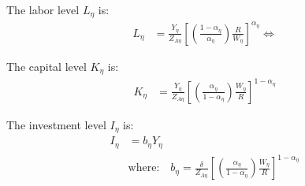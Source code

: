 \documentclass[../thesis.tex]{subfiles}
\begin{document}
\begin{comment}
	\begin{align}
		& Y_{\eta} = Y_{\eta j} \label{eq_v2:reg-ss-final-goods-firm-bundle-rule-2} \\
		& Y_{\eta} = Z_{A\eta} K_{\eta}^{\alpha_{\eta}} L_{\eta}^{1-{\alpha_{\eta}}} \label{eq_v2:reg-ss-int-good-firm-production-function-2} \\
		& \frac{K_{\eta}}{L_{\eta}} = \left( \frac{{\alpha_{\eta}}}{1-\alpha_{\eta}} \right) \frac{W_{\eta}}{R_{K}} \label{eq_v2:reg-ss-int-good-firm-TMRS-2} \\
		& L_{\eta} = L_{\eta j} \label{eq_v2:reg-ss-market-clearing-condition-Lt-2} \\
		& Q_{\eta} C_{\eta} + P_{\eta} I_{\eta} = R_{} K_{\eta} + P_{\eta} Y_{\eta} \label{eq_v2:reg-ss-budget-constraint-4}
	\end{align}
\end{comment}


The labor level $L_{\eta}$ is:
\begin{align}
	L_{\eta} &= \frac{Y_{\eta}}{Z_{A\eta}} \left[ \left( \frac{1-\alpha_{\eta}}{{\alpha_{\eta}}} \right) \frac{R}{W_{\eta}} \right]^{\alpha_{\eta}} \iff %
	\label{eq_v2:reg-ss-int-good-firm-production-function-3}
\end{align}


The capital level $K_{\eta}$ is:
\begin{align}
	K_{\eta} &= \frac{Y_{\eta}}{Z_{A\eta}} \left[ \left( \frac{{\alpha_{\eta}}}{1-\alpha_{\eta}} \right) \frac{W_{\eta}}{R} \right]^{1 - \alpha_{\eta}} \label{eq_v2:reg-ss-capital-demand}
\end{align}


The investment level $I_{\eta}$ is:
\begin{align}
	I_{\eta} &= b_{\eta} Y_{\eta} \label{eq_v2:reg-ss-law-of-motion-of-capital-2} \\
	& \text{where:} \quad b_{\eta} = \frac{\delta}{Z_{A\eta}} \left[ \left( \frac{{\alpha_{\eta}}}{1-\alpha_{\eta}} \right) \frac{W_{\eta}}{R} \right]^{1 - \alpha_{\eta}} \label{eq_v2:reg-ss-b-eta}
\end{align}
\end{document}
